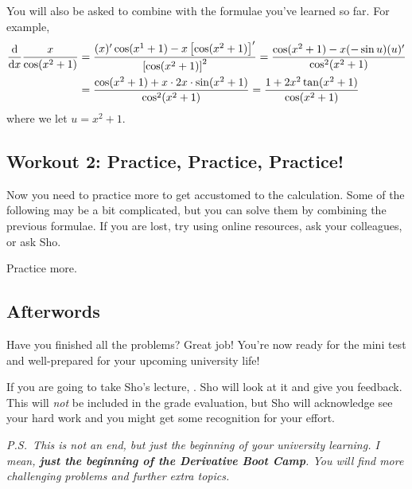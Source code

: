 \documentclass[11pt,pdfa,lastpage]{MishoNote}
\begin{document}
You will also be asked to combine with the formulae you've learned so far. For example,
  \begin{align*}
  \diff{}{x}\frac{x}{\cos(x^2+1)}
  &= \frac{(x)'\cos(x^1+1)-x\left[\cos(x^2+1)\right]'}{\left[\cos(x^2+1)\right]^2}
  = \frac{\cos(x^2+1)-x(-\sin u)(u)'}{\cos^2(x^2+1)}
  \\&= \frac{\cos(x^2+1)+x\cdot 2x\cdot \sin (x^2+1)}{\cos^2(x^2+1)} = \frac{1+2x^2\tan(x^2+1)}{\cos(x^2+1)}
  \end{align*}
where we let $u=x^2+1$.


\subsection{Workout 2: Practice, Practice, Practice!}
Now you need to practice more to get accustomed to the calculation.
Some of the following may be a bit complicated, but you can solve them by combining the previous formulae.
If you are lost, try using online resources, ask your colleagues, or ask Sho.

\begin{problems}
  \Problem[S] Practice more.
\begin{menumerate}{3}
\end{menumerate}
\end{problems}

\vfill
\subsection*{Afterwords}

Have you finished all the problems? Great job! You're now ready for the mini test and well-prepared for your upcoming university life!

If you are going to take Sho's lecture, .
Sho will look at it and give you feedback. This will \emph{not} be included in the grade evaluation, but Sho will acknowledge see your hard work and you might get some recognition for your effort.


\vfill

\noindent
\emph{P.S.~This is not an end, but just the beginning of your university learning. I mean, \textbf{just the beginning of the Derivative Boot Camp}. You will find more challenging problems and further extra topics.}
\end{document}

